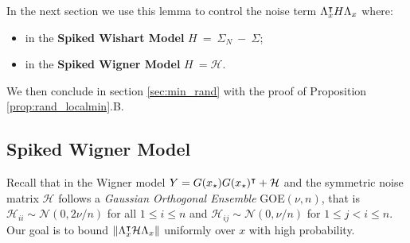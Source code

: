 In the next section we use this lemma to control the noise term $\Lambda_x^\intercal H \Lambda_x$ where:
\begin{itemize}
	\item in the \textbf{Spiked Wishart Model} $H~=~\Sigma_N~-~\Sigma$;
	\item in the \textbf{Spiked Wigner Model} $H~=\mathcal{H}$.
\end{itemize}

We then conclude in section \ref{sec:min_rand} with the proof of Proposition \ref{prop:rand_localmin}.B.

\subsection{Spiked Wigner Model}

Recall that in the Wigner model $Y = G({x_{\star}}) G({x_{\star}})^\intercal + \mathcal{H}$ and  the symmetric noise matrix $\mathcal{H}$ follows a \textit{Gaussian Orthogonal Ensemble} GOE$(\nu, n)$, that is $\mathcal{H}_{ii} \sim \mathcal{N}(0, 2\nu/n)$ for all $1 \leq i \leq n$ and $\mathcal{H}_{ij} \sim \mathcal{N}(0,\nu/n)$ for $1 \leq j < i \leq n$. 
Our goal is to bound $ \| \Lambda_x^\intercal \mathcal{H} \Lambda_x \| $ uniformly over $x$ with high probability.

